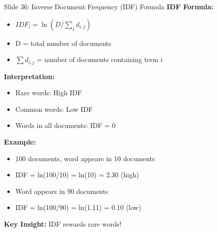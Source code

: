 \documentclass[8pt]{beamer}
\begin{document}
	\begin{frame}{Slide 36: Inverse Document Frequency (IDF) Formula}
		\fontsize{6.5}{7.5}\selectfont
		\textbf{IDF Formula:}
		\begin{itemize}
			\item $IDF_i = \ln(D / \sum_{j} d_{i,j})$
			\item D = total number of documents
			\item $\sum d_{i,j}$ = number of documents containing term i
		\end{itemize}
		
		\vspace{0.1cm}
		\textbf{Interpretation:}
		\begin{itemize}
			\item Rare words: High IDF
			\item Common words: Low IDF
			\item Words in all documents: IDF = 0
		\end{itemize}
		
		\vspace{0.1cm}
		\textbf{Example:}
		\begin{itemize}
			\item 100 documents, word appears in 10 documents
			\item IDF = ln(100/10) = ln(10) = 2.30 (high)
			\item Word appears in 90 documents
			\item IDF = ln(100/90) = ln(1.11) = 0.10 (low)
		\end{itemize}
		
		\textcolor{myblue}{\textbf{Key Insight:}} IDF rewards rare words!
	\end{frame}
	
\end{document}
